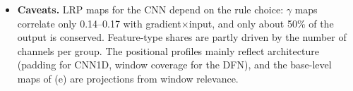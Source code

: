 \begin{itemize}
\item \textbf{Caveats.} LRP maps for the CNN depend on the rule choice: $\gamma$ maps correlate only 0.14--0.17 with gradient$\times$input, and only about 50\% of the output is conserved. Feature-type shares are partly driven by the number of channels per group. The positional profiles mainly reflect architecture (padding for CNN1D, window coverage for the DFN), and the base-level maps of (e) are projections from window relevance.
\end{itemize}
